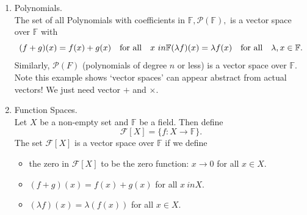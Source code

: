 \documentclass{article}
\begin{document}
\begin{enumerate}
  \item Polynomials.\\The set of all Polynomials with coefficients in $\mathbb{F}, \mathcal{P}(\mathbb{F}),$ is a vector space over $\mathbb{F}$ with \[(f+g)(x) = f(x) + g(x) \quad \text{for all} \quad x \ in \mathbb{F} \\ (\lambda f)(x) = \lambda f(x) \quad \text{for all} \quad \lambda, x \in \mathbb{F}.\]Similarly, $\mathcal{P}(F)$ (polynomials of degree $n$ or less) is a vector space over $\mathbb{F}$. Note this example shows `vector spaces' can appear abstract from actual vectors! We just need vector $+$ and $\times$.
  \item Function Spaces.\\Let $X$ be a non-empty set and $\mathbb{F}$ be a field. Then define \[\mathcal{F}[X] = \{f: X \rightarrow \mathbb{F} \}.\]The set $\mathcal{F}[X]$ is a vector space over $\mathbb{F}$ if we define \begin{itemize}\item the zero in $\mathcal{F}[X]$ to be the zero function: $x \rightarrow 0$ for all $x \in X$.
  \item $(f+g)(x) = f(x) + g(x)$ for all $x \ in X$.
  \item $(\lambda f)(x) = \lambda (f(x))$ for all $x \in X$.
  \end{itemize}
\end{enumerate}
\end{document}
